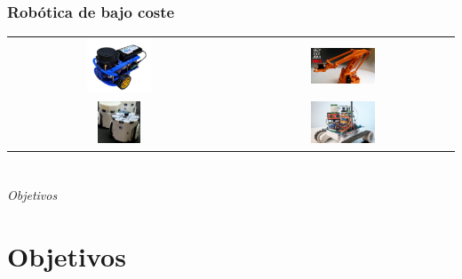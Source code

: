 \documentclass{beamer}
\begin{document}
\begin{frame}
\frametitle{Robótica de bajo coste}
\begin{table}[htbp]
  \centering
  \begin{tabular}{cc}
      \includegraphics[width=0.3\textwidth, valign=m]{figs/andino.png} & \includegraphics[width=0.3\textwidth, valign=m]{figs/eezy.jpg} \\
      \includegraphics[width=0.2\textwidth, valign=m]{figs/hero.png} & \includegraphics[width=0.3\textwidth, valign=m]{figs/r5robot.png} 
  \end{tabular}
\end{table}
\end{frame}

\section*{}
\begin{frame}{}
  \centering \Huge
  \emph{Objetivos}
\end{frame}

\section{Objetivos}
\end{document}
